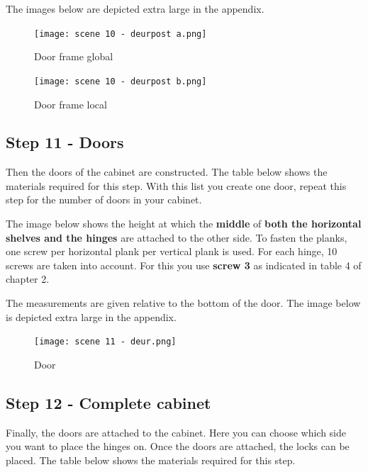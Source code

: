 \documentclass{article}
\begin{document}
The images below are depicted extra large in the appendix.

\begin{figure}[h!]
    \centering
    \texttt{[image: scene 10 - deurpost a.png]}
    \caption{Door frame global}
    \label{fig:stap 10a}
\end{figure}

\begin{figure}[h!]
    \centering
    \texttt{[image: scene 10 - deurpost b.png]}
    \caption{Door frame local}
    \label{fig:stap 10b}
\end{figure}

\clearpage
\newpage

\subsection{Step 11 - Doors}

Then the doors of the cabinet are constructed. The table below shows the materials required for this step. With this list you create one door, repeat this step for the number of doors in your cabinet.



The image below shows the height at which the \textbf{middle} of \textbf{both the horizontal shelves and the hinges} are attached to the other side. To fasten the planks, one screw per horizontal plank per vertical plank is used. For each hinge, 10 screws are taken into account. For this you use \textbf{screw 3} as indicated in table 4 of chapter 2.

The measurements are given relative to the bottom of the door. The image below is depicted extra large in the appendix.

\begin{figure}[h!]
    \centering
    \texttt{[image: scene 11 - deur.png]}
    \caption{Door}
    \label{fig:stap 11}
\end{figure}

\clearpage
\newpage

\subsection{Step 12 - Complete cabinet}

Finally, the doors are attached to the cabinet. Here you can choose which side you want to place the hinges on. Once the doors are attached, the locks can be placed. The table below shows the materials required for this step.
\end{document}
